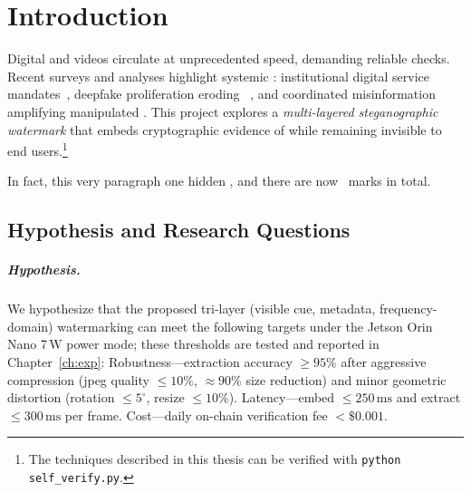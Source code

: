 \chapter{Introduction}
\label{ch:intro}

\newcommand{\wmTotal}{\textbf{\arabic{wmcount}}}

\begin{overview}
    Digital  and videos circulate at unprecedented speed, demanding
    reliable  checks.
    Recent surveys and analyses highlight
    systemic : institutional digital service mandates~\cite{ministereDSI2024},
    deepfake proliferation eroding ~\cite{smith2023deepfakes}, and
    coordinated misinformation ~\cite{doe2024misinfo} amplifying
    manipulated .
    This project explores a
    \emph{multi-layered steganographic watermark} that embeds cryptographic
    evidence of  while remaining invisible to end users.\footnote{%
        The techniques described in this thesis can be verified with
        \texttt{python self\_verify.py}.}

    In fact, this very paragraph  one hidden , and
    there are now \wmTotal\ marks in total.
\end{overview}

\chapterdivider

\section{Hypothesis and Research Questions}
\label{sec:intro:hypothesis}

\paragraph{Hypothesis.} We hypothesize that the proposed tri-layer (visible cue, metadata, frequency-domain) watermarking  can meet the following targets under the Jetson Orin Nano 7\,W power mode; these thresholds are tested and reported in Chapter~\ref{ch:exp}: Robustness—extraction accuracy $\ge 95\%$ after aggressive compression (\gls{jpeg} quality $\le 10\%$, $\approx 90\%$ size reduction) and minor geometric distortion (rotation $\le 5^{\circ}$, resize $\le 10\%$). Latency—embed $\le 250\,\mathrm{ms}$ and extract $\le 300\,\mathrm{ms}$ per frame. Cost—daily on-chain verification fee $<\$0.001$.

